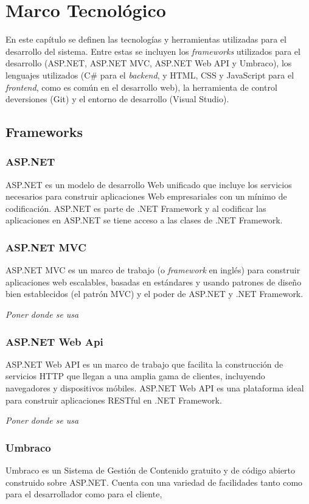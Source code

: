 \chapter{Marco Tecnológico}
En este capítulo se definen las tecnologías y herramientas utilizadas para el desarrollo del sistema. Entre estas se incluyen los \textit{frameworks} utilizados para el desarrollo (ASP.NET, ASP.NET MVC, ASP.NET Web API y Umbraco), los lenguajes utilizados (C\# para el \textit{backend}, y HTML, CSS y JavaScript para el \textit{frontend}, como es común en el desarrollo web), la herramienta de control deversiones (Git) y el entorno de desarrollo (Visual Studio).

\section{Frameworks}
\subsection{ASP.NET}
ASP.NET es un modelo de desarrollo Web unificado que incluye los servicios necesarios para construir aplicaciones Web empresariales con un mínimo de codificación. ASP.NET es parte de .NET Framework y al codificar las aplicaciones en ASP.NET se tiene acceso a las clases de .NET Framework. \cite{asp.netMicrosoft}

\subsection{ASP.NET MVC}
ASP.NET MVC es un marco de trabajo (o \textit{framework} en inglés) para construir aplicaciones web escalables, basadas en estándares y usando patrones de diseño bien establecidos (el patrón MVC) y el poder de ASP.NET y .NET Framework. \cite{asp.netMVCMicrosoft}

\emph{Poner donde se usa}

\subsection{ASP.NET Web Api}
ASP.NET Web API es un marco de trabajo que facilita la construcción de servicios HTTP que llegan a una amplia gama de clientes, incluyendo navegadores y dispositivos móbiles. ASP.NET Web API es una plataforma ideal para construir aplicaciones RESTful en .NET Framework. \cite{asp.netWebAPIMicrosoft}

\emph{Poner donde se usa}

\subsection{Umbraco}
Umbraco es un Sistema de Gestión de Contenido gratuito y de código abierto construido sobre ASP.NET. Cuenta con una variedad de facilidades tanto como para el desarrollador como para el cliente,

